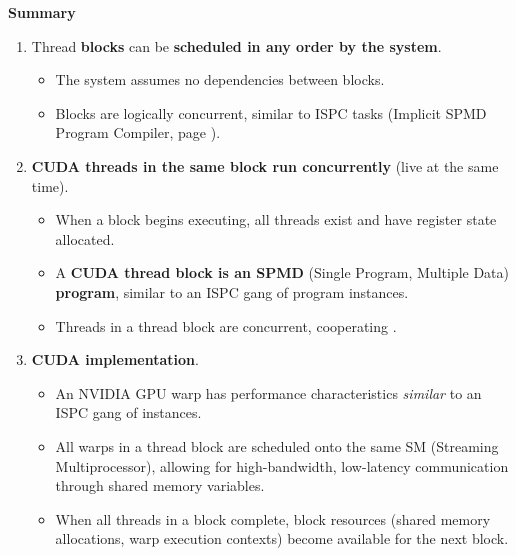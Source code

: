 \begin{flushleft}
    \textcolor{Red2}{ \textbf{Summary}}
\end{flushleft}
\begin{enumerate}
    \item Thread \textbf{blocks} can be \textbf{scheduled in any order by the system}.
    \begin{itemize}
        \item The system assumes no dependencies between blocks.
        \item Blocks are logically concurrent, similar to ISPC tasks (Implicit SPMD Program Compiler, page \pageref{definitionbox: Implicit SPMD Program Compiler (ISPC)}).
    \end{itemize}

    \item \textbf{CUDA threads in the same block run concurrently} (live at the same time).
    \begin{itemize}
        \item When a block begins executing, all threads exist and have register state allocated.
        \item A \textbf{CUDA thread block is an SPMD} (Single Program, Multiple Data) \textbf{program}, similar to an ISPC gang of program instances.
        \item Threads in a thread block are concurrent, cooperating .
    \end{itemize}

    \newpage

    \item \textbf{CUDA implementation}.
    \begin{itemize}
        \item An NVIDIA GPU warp has performance characteristics \emph{similar} to an ISPC gang of instances.
        \item All warps in a thread block are scheduled onto the same SM (Streaming Multiprocessor), allowing for high-bandwidth, low-latency communication through shared memory variables.
        \item When all threads in a block complete, block resources (shared memory allocations, warp execution contexts) become available for the next block.
    \end{itemize}
\end{enumerate}
 